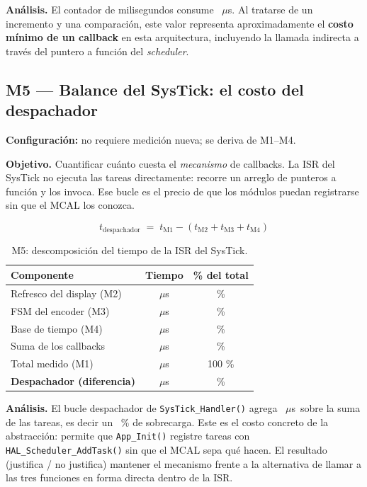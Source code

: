 \documentclass[11pt,a4paper]{article}
\newcommand{\dato}[1][2cm]{\underline{\hspace{#1}}}
\newcommand{\us}{\ensuremath{\mu}s}
\begin{document}
\textbf{Análisis.} El contador de milisegundos consume \dato\ \us. Al tratarse
de un incremento y una comparación, este valor representa aproximadamente el
\textbf{costo mínimo de un callback} en esta arquitectura, incluyendo la
llamada indirecta a través del puntero a función del \textit{scheduler}.

\subsection{M5 --- Balance del SysTick: el costo del despachador}

\textbf{Configuración:} no requiere medición nueva; se deriva de M1--M4.

\textbf{Objetivo.} Cuantificar cuánto cuesta el \emph{mecanismo} de callbacks.
La ISR del SysTick no ejecuta las tareas directamente: recorre un arreglo de
punteros a función y los invoca. Ese bucle es el precio de que los módulos
puedan registrarse sin que el MCAL los conozca.

\[
t_{\text{despachador}} \;=\; t_{\text{M1}} - \left( t_{\text{M2}} + t_{\text{M3}} + t_{\text{M4}} \right)
\]

\begin{table}[H]
\centering
\begin{tabular}{@{}lcc@{}}
\toprule
\textbf{Componente} & \textbf{Tiempo} & \textbf{\% del total} \\
\midrule
Refresco del display (M2) & \dato[1.5cm] \us & \dato[1.2cm] \% \\
FSM del encoder (M3)      & \dato[1.5cm] \us & \dato[1.2cm] \% \\
Base de tiempo (M4)       & \dato[1.5cm] \us & \dato[1.2cm] \% \\
\midrule
Suma de los callbacks     & \dato[1.5cm] \us & \dato[1.2cm] \% \\
Total medido (M1)         & \dato[1.5cm] \us & 100 \% \\
\midrule
\textbf{Despachador (diferencia)} & \dato[1.5cm] \us & \dato[1.2cm] \% \\
\bottomrule
\end{tabular}
\caption{M5: descomposición del tiempo de la ISR del SysTick.}
\end{table}

\textbf{Análisis.} El bucle despachador de \texttt{SysTick\_Handler()} agrega
\dato\ \us\ sobre la suma de las tareas, es decir un \dato\ \% de sobrecarga.
Este es el costo concreto de la abstracción: permite que \texttt{App\_Init()}
registre tareas con \texttt{HAL\_Scheduler\_AddTask()} sin que el MCAL sepa qué
hacen. El resultado \dato{} (justifica / no justifica) mantener el mecanismo
frente a la alternativa de llamar a las tres funciones en forma directa
dentro de la ISR.
\end{document}
